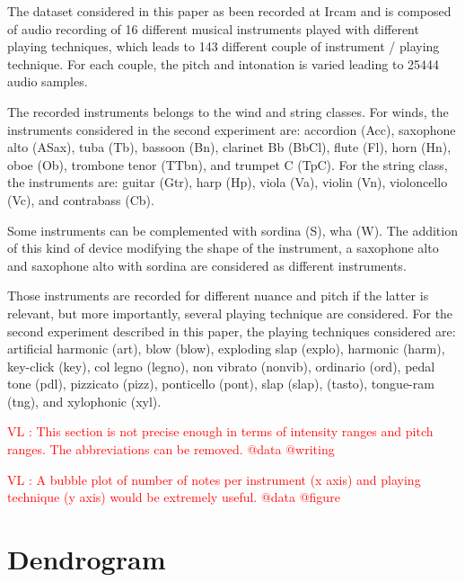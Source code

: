 \documentclass{article}
\newcommand{\vl}[1]{\textcolor{red}{VL : #1}}
\begin{document}
The dataset considered in this paper as been recorded at Ircam and is composed of audio recording of 16 different musical instruments played with different playing techniques, which leads to 143 different couple of instrument / playing technique. For each couple, the pitch and intonation is varied leading to 25444 audio samples.

The recorded instruments belongs to the wind and string classes. For winds, the instruments considered in the second experiment are: accordion (Acc), saxophone alto (ASax), tuba (Tb), bassoon (Bn), clarinet Bb (BbCl), flute (Fl), horn (Hn), oboe (Ob), trombone tenor (TTbn), and trumpet C (TpC). For the string class, the instruments are: guitar (Gtr), harp (Hp), viola (Va), violin (Vn), violoncello (Vc), and contrabass (Cb).

Some instruments can be complemented with sordina (S), wha (W). The addition of this kind of device modifying the shape of the instrument, a saxophone alto and saxophone alto with sordina are considered as different instruments.

Those instruments are recorded for different nuance and pitch if the latter is relevant, but more importantly, several playing technique are considered. For  the second experiment described in this paper, the playing techniques considered are: artificial harmonic (art), blow (blow), exploding slap  (explo), harmonic (harm), key-click (key), col legno   (legno), non vibrato (nonvib), ordinario (ord), pedal tone (pdl), pizzicato (pizz), ponticello (pont), slap (slap), (tasto), tongue-ram (tng), and xylophonic (xyl).

\vl{This section is not precise enough in terms of intensity ranges and pitch ranges.
The abbreviations can be removed. @data @writing}

\vl{A bubble plot of number of notes per instrument (x axis) and playing technique
(y axis) would be extremely useful. @data @figure}

\section{Dendrogram}
\end{document}
